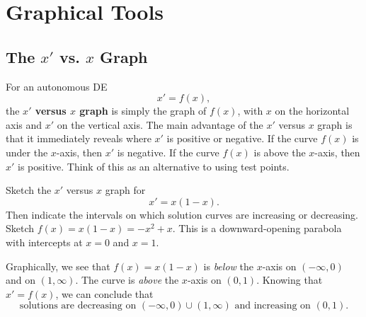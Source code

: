 \documentclass[10pt,letterpaper]{article}
\begin{document}
\section{Graphical Tools}

\subsection{The $x'$ vs. $x$ Graph}

For an autonomous DE
\[
    x'=f(x),
\]
the \textbf{$x'$ versus $x$ graph} is simply the graph of $f(x)$, with $x$
on the horizontal axis and $x'$ on the vertical axis. The main advantage of the $x'$ versus $x$ graph is that it immediately reveals where $x'$ is positive or negative. If the curve $f(x)$ is under the $x$-axis, then $x'$ is negative. If the curve $f(x)$ is above the $x$-axis, then $x'$ is positive. Think of this as an alternative to using test points. 


\begin{example}[3]{
Sketch the $x'$ versus $x$ graph for 
\[
    x'=x(1-x).
\]
Then indicate the intervals on which solution curves are increasing or decreasing.
}
Sketch $f(x)=x(1-x)=-x^2+x$. This is a downward-opening parabola with intercepts at $x=0$ and $x=1$. 
\begin{figure}[H]
    \centering
{}
\end{figure}
Graphically, we see that $f(x)=x(1-x)$ is \textit{below} the $x$-axis on $(-\infty,0)$ and on $(1,\infty)$. The curve is \textit{above} the $x$-axis on $(0,1)$. Knowing that $x'=f(x)$, we can conclude that 
\[
\boxed{
\text{solutions are decreasing on }(-\infty,0)\cup(1,\infty)
\text{ and increasing on }(0,1).
}
\]
\end{example}
\end{document}
